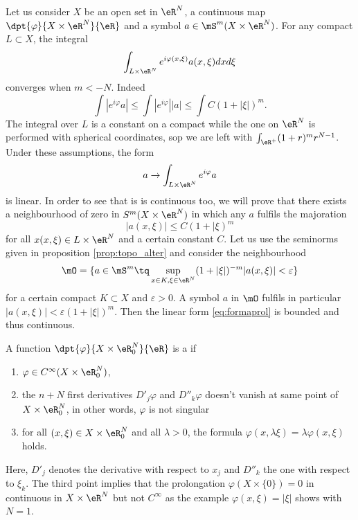 Let us consider $X$ be an open set in $\eR^N$, a continuous map $\dpt{\varphi}{X\times\eR^N}{\eR}$ and a symbol $a\in\mS^{m}(X\times\eR^N)$. For any compact $L\subset X$, the integral
\[ 
\int_{L\times\eR^N}e^{i\varphi(x,\xi)}a(x,\xi)dxd\xi
\]
converges when $m<-N$. Indeed
\begin{equation}
   \int |e^{i\varphi}a|\leq\int|e^{i\varphi}||a|
                       \leq\int C(1+|\xi|)^m.
\end{equation}
The integral over $L$ is a constant on a compact while the one on $\eR^N$ is performed with spherical coordinates, sop we are left with $\int_{\eR^+}(1+r)^mr^{N-1}$. Under these assumptions, the form
\begin{equation}  \label{eq:formaprol}
 a\to\int_{L\times\eR^N}e^{i\varphi}a
\end{equation}
is linear. In order to see that is is continuous too, we will prove that there exists a neighbourhood of zero in $S^m(X\times\eR^N)$ in which any $a$ fulfils the majoration
\[ 
  |a(x,\xi)|\leq C(1+|\xi)^m
\]
for all $x(x,\xi)\in L\times\eR^N$ and a certain constant $C$. Let us use the seminorms given in proposition \ref{prop:topo_alter}  and consider the neighbourhood
\[ 
\mO=\{ a\in\mS^m\tq\sup_{x\in K,\xi\in\eR^N}(1+| \xi |)^{-m}| a(x,\xi) |<\varepsilon \}
\]
for a certain compact $K\subset X$ and $\varepsilon>0$. A symbol $a$ in $\mO$ fulfils in particular
$| a(x,\xi) |<\varepsilon(1+| \xi |)^m$. Then the linear form \eqref{eq:formaprol} is bounded and thus continuous.

\begin{definition} \label{def:phase}

A function $\dpt{\varphi}{X\times\eR^N_0}{\eR}$ is a  if

\begin{enumerate}
\item $\varphi\in C^{\infty}(X\times\eR^N_0)$,
\item the $n+N$ first derivatives $D'_j\varphi$ and $D''_k\varphi$ doesn't vanish at same point of $X\times\eR^N_0$, in other words, $\varphi$ is not singular
\item for all $(x,\xi)\in X\times\eR^N_0$ and all $\lambda>0$, the formula $\varphi(x,\lambda\xi)=\lambda\varphi(x,\xi)$ holds.
\end{enumerate}

\end{definition}
Here, $D'_j$ denotes the derivative with respect to $x_j$ and $D''_k$ the one with respect to $\xi_k$. The third point implies that the prolongation $\varphi(X\times\{  0\})=0$ in continuous in $X\times\eR^N$ but not $C^{\infty}$ as the example $\varphi(x,\xi)=| \xi |$ shows with $N=1$.

